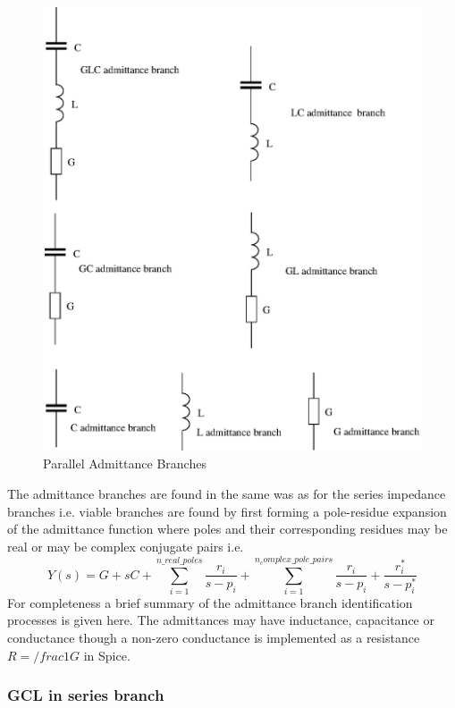 \begin{figure}[ht]
\centering
\includegraphics[scale=0.7]{./Imgs/parallel_admittance_branches.eps}
\caption{Parallel Admittance Branches}
\label{fig:parallel_admittance_branches}
\end{figure}
%
The admittance branches are found in the same was as for the series impedance branches i.e. viable branches are found by first forming a pole-residue expansion of the admittance function where poles and their corresponding residues may be real or may be complex conjugate pairs i.e. 
%
\begin{equation} \label{eq:rational_function_Y}
Y\left(s\right)=G+sC+\sum_{i=1}^{n\_real\_poles} \frac{r_i}{s-p_i} + 
                           \sum_{i=1}^{n_complex\_pole\_pairs} \frac{r_i}{s-p_i}+\frac{r_i^*}{s-p_i^*}
\end{equation}
%
For completeness a brief summary of the admittance branch identification processes is given here. The admittances may have inductance, capacitance or conductance though a non-zero conductance is implemented as a resistance $R=/frac{1}{G}$ in Spice.

\subsubsection{GCL in series branch}

